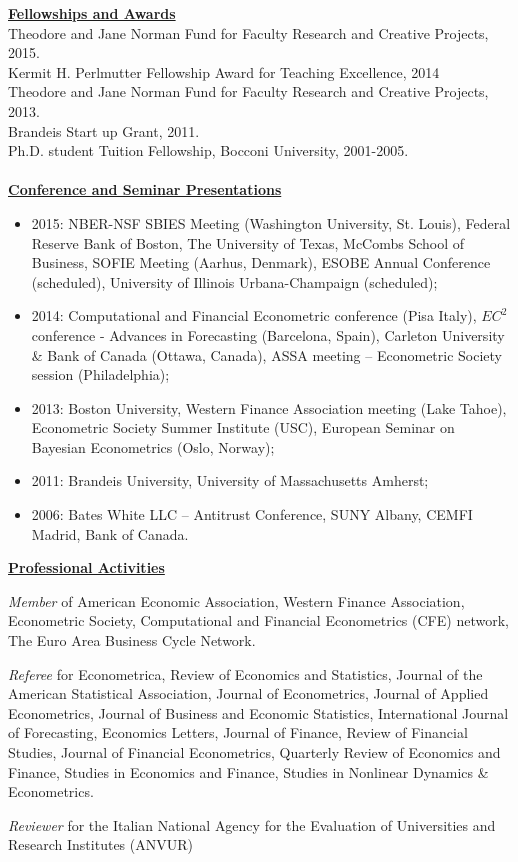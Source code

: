 \documentclass[12pt]{article}
\begin{document}
\underline{\textbf{Fellowships and Awards}}\\
Theodore and Jane Norman Fund for Faculty Research and Creative Projects, 2015. \\
Kermit H. Perlmutter Fellowship Award for Teaching Excellence, 2014 \\
Theodore and Jane Norman Fund for Faculty Research and Creative Projects, 2013. \\
Brandeis Start up Grant, 2011. \\
Ph.D. student Tuition Fellowship, Bocconi University, 2001-2005.\\ \\
\underline{\textbf{Conference and Seminar Presentations}}
\begin{itemize}
  \item 2015: NBER-NSF SBIES Meeting (Washington University, St. Louis), Federal Reserve Bank of Boston, The University of Texas, McCombs School of Business, SOFIE Meeting (Aarhus, Denmark), ESOBE Annual Conference (scheduled), University of Illinois Urbana-Champaign (scheduled);
	\item 2014: Computational and Financial Econometric conference (Pisa Italy), $EC^2$ conference - Advances in Forecasting (Barcelona, Spain),  Carleton University & Bank of Canada (Ottawa, Canada), ASSA meeting -- Econometric Society session (Philadelphia);  
	\item 2013: Boston University, Western Finance Association meeting (Lake Tahoe), Econometric Society Summer Institute (USC), European Seminar on Bayesian Econometrics (Oslo, Norway); 
	\item 2011: Brandeis University, University of Massachusetts Amherst; 
	\item 2006: Bates White LLC -- Antitrust Conference, SUNY Albany, CEMFI Madrid, Bank of Canada.
\end{itemize}

\underline{\textbf{Professional Activities}}
\begin{description}
\item\emph{Member} of American Economic Association, Western Finance Association, Econometric Society, Computational and Financial Econometrics (CFE) network, The Euro Area Business Cycle Network.

\item \emph{Referee} for Econometrica, Review of Economics and Statistics, Journal of the American Statistical Association, Journal of Econometrics, Journal of Applied Econometrics, Journal of Business and Economic Statistics, International Journal of Forecasting, Economics Letters, Journal of Finance, Review of Financial Studies, Journal of Financial Econometrics, Quarterly Review of Economics and Finance, Studies in Economics and Finance, Studies in Nonlinear Dynamics & Econometrics.

\item \emph{Reviewer} for the Italian National Agency for the Evaluation of Universities and Research Institutes (ANVUR) 
\end{description}
 
\end{document}
